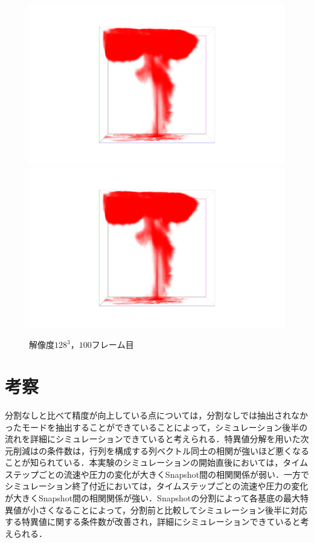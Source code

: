 \documentclass[a4j,12pt]{jreport}
\begin{document}
\begin{figure}[htbp]
\caption{$解像度128^3，100フレーム目$}
\includegraphics[width=140mm]{images/n128_f99_dev2.png}
\includegraphics[width=140mm]{images/n128_f100_dev2.png}
\label{fig:n128_f99}
\end{figure}
\section{考察}
分割なしと比べて精度が向上している点については，分割なしでは抽出されなかったモードを抽出することができていることによって，シミュレーション後半の流れを詳細にシミュレーションできていると考えられる．特異値分解を用いた次元削減はの条件数は，行列を構成する列ベクトル同士の相関が強いほど悪くなることが知られている．本実験のシミュレーションの開始直後においては，タイムステップごとの流速や圧力の変化が大きくSnapshot間の相関関係が弱い．一方でシミュレーション終了付近においては，タイムステップごとの流速や圧力の変化が大きくSnapshot間の相関関係が強い．Snapshotの分割によって各基底の最大特異値が小さくなることによって，分割前と比較してシミュレーション後半に対応する特異値に関する条件数が改善され，詳細にシミュレーションできていると考えられる．
\end{document}
